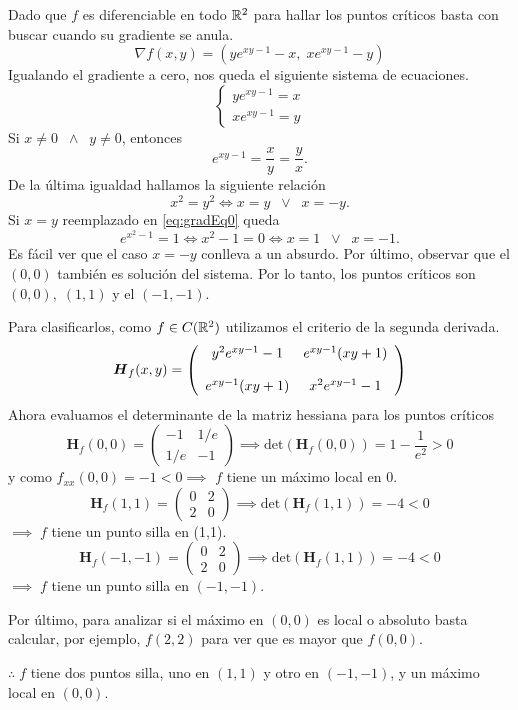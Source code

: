 \begin{solution}
    Dado que $f$ es diferenciable en todo $\mathbb{R}^2$    para hallar los puntos cr\'iticos  basta con buscar cuando su  gradiente se anula.
    \[
        \nabla f(x,y)= \left( ye^{xy-1}-x,\; xe^{xy-1}-y \right)
    \]
    Igualando el gradiente a cero, nos queda el siguiente sistema de ecuaciones.
    \[
        \begin{cases}
            ye^{xy-1}=x \\
            xe^{xy-1}=y
        \end{cases}
    \]
    Si $x\neq0 \;\;\land\;\; y\neq0$, entonces
    \begin{equation}
        e^{xy-1}=\frac{x}{y}=\frac{y}{x}. \label{eq:gradEq0}
    \end{equation}
    De la última igualdad hallamos la siguiente relación  $$  x^2=y^2 \iff x=y \;\;\lor\;\; x=-y.$$
    Si  $x=y$ reemplazado en  \eqref{eq:gradEq0} queda
    $$  e^{x^2-1}=1  \iff  x^2-1=0 \iff x=1 \;\;\lor\;\; x=-1.$$
    Es f\'acil ver que el caso  $x=-y$  conlleva a un absurdo.   Por \'ultimo, observar que  el $(0,0)$  también es solución del sistema.  Por lo tanto, los puntos críticos son $(0,0),\;(1,1)$ y el $(-1,-1)$.

    Para clasificarlos,  como $f \in C(\mathbb{R}^2)$ utilizamos el criterio de la segunda derivada.
    \[
        \setlength{\abovedisplayskip}{0.5cm}
        \setlength{\belowdisplayskip}{0.5cm}
        \boldsymbol{H}_f(x,y) = \left(\begin{array}{cc}
                y^2e^{xy-1}-1  & e^{xy-1}(xy+1) \\[.4cm]
                e^{xy-1}(xy+1) & x^2e^{xy-1}-1
            \end{array}\right)
    \]
    Ahora evaluamos el determinante de la matriz hessiana para los puntos críticos
    \[
        \boldsymbol{H}_f(0,0) = \left(\begin{array}{cc}
                -1  & 1/e \\
                1/e & -1
            \end{array}\right)
        \implies \text{det} \left( \boldsymbol{H}_f(0,0) \right)  = 1 - \frac{1}{e^2} > 0
    \]
    y como $f_{xx}(0,0)=-1<0 \implies$ $f$ tiene un máximo local en 0.
    \[
        \boldsymbol{H}_f(1,1) = \left(\begin{array}{cc}
                0 & 2 \\
                2 & 0
            \end{array}\right)
        \implies \text{det} \left( \boldsymbol{H}_f(1,1) \right)  = -4 < 0
    \]
    $\implies \;f$ tiene un punto silla en (1,1).
    \[
        \boldsymbol{H}_f(-1,-1) = \left(\begin{array}{cc}
                0 & 2 \\
                2 & 0
            \end{array}\right)
        \implies \text{det} \left( \boldsymbol{H}_f(1,1) \right)  = -4 < 0
    \]
    $\implies \;f$ tiene un punto silla en $(-1,-1)$.

    Por último, para analizar si el máximo en $(0,0)$ es local o absoluto basta calcular, por ejemplo, $f(2,2)$ para ver que es mayor que $f(0,0)$.

    $\therefore\;f$ tiene dos puntos silla, uno en $(1,1)$ y otro en $(-1,-1)$, y un máximo local en $(0,0)$.

\end{solution}

